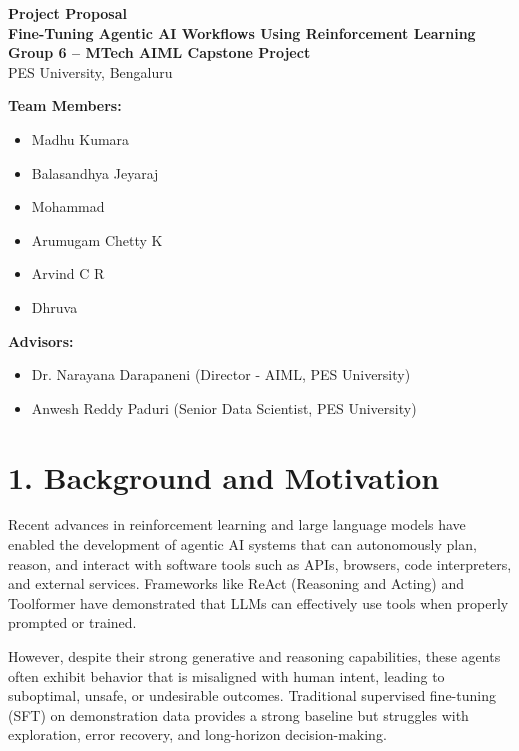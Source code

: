 \documentclass[12pt]{article}
\begin{document}
\begin{center}
\textbf{\Large Project Proposal}\\[0.3cm]
\textbf{\large Fine-Tuning Agentic AI Workflows Using Reinforcement Learning}\\[0.5cm]
\textbf{Group 6 -- MTech AIML Capstone Project}\\[0.3cm]
PES University, Bengaluru\\[0.5cm]
\end{center}

\noindent\textbf{Team Members:}
\begin{itemize}
    \item Madhu Kumara
    \item Balasandhya Jeyaraj
    \item Mohammad
    \item Arumugam Chetty K
    \item Arvind C R
    \item Dhruva
\end{itemize}

\noindent\textbf{Advisors:}
\begin{itemize}
    \item Dr. Narayana Darapaneni (Director - AIML, PES University)
    \item Anwesh Reddy Paduri (Senior Data Scientist, PES University)
\end{itemize}

\vspace{0.5cm}

\section*{1. Background and Motivation}

Recent advances in reinforcement learning and large language models have enabled the development of agentic AI systems that can autonomously plan, reason, and interact with software tools such as APIs, browsers, code interpreters, and external services. Frameworks like ReAct (Reasoning and Acting) and Toolformer have demonstrated that LLMs can effectively use tools when properly prompted or trained.

However, despite their strong generative and reasoning capabilities, these agents often exhibit behavior that is misaligned with human intent, leading to suboptimal, unsafe, or undesirable outcomes. Traditional supervised fine-tuning (SFT) on demonstration data provides a strong baseline but struggles with exploration, error recovery, and long-horizon decision-making.
\end{document}
